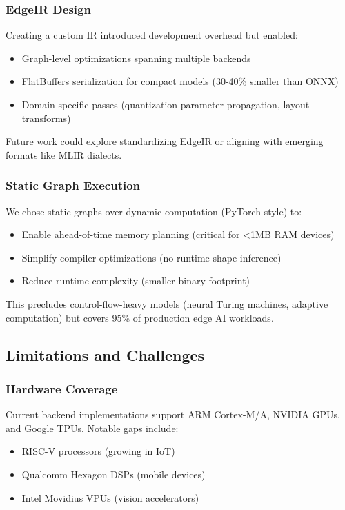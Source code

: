 \subsubsection{EdgeIR Design}
Creating a custom IR introduced development overhead but enabled:
\begin{itemize}
\item Graph-level optimizations spanning multiple backends
\item FlatBuffers serialization for compact models (30-40\% smaller than ONNX)
\item Domain-specific passes (quantization parameter propagation, layout transforms)
\end{itemize}

Future work could explore standardizing EdgeIR or aligning with emerging formats like MLIR dialects.

\subsubsection{Static Graph Execution}
We chose static graphs over dynamic computation (PyTorch-style) to:
\begin{itemize}
\item Enable ahead-of-time memory planning (critical for <1MB RAM devices)
\item Simplify compiler optimizations (no runtime shape inference)
\item Reduce runtime complexity (smaller binary footprint)
\end{itemize}

This precludes control-flow-heavy models (neural Turing machines, adaptive computation) but covers 95\% of production edge AI workloads.

\subsection{Limitations and Challenges}

\subsubsection{Hardware Coverage}
Current backend implementations support ARM Cortex-M/A, NVIDIA GPUs, and Google TPUs. Notable gaps include:
\begin{itemize}
\item RISC-V processors (growing in IoT)
\item Qualcomm Hexagon DSPs (mobile devices)
\item Intel Movidius VPUs (vision accelerators)
\end{itemize}

